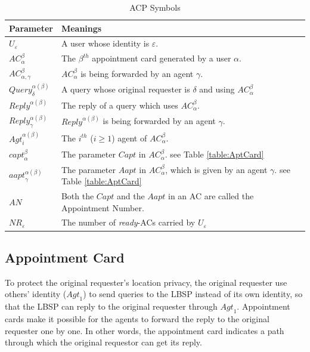 \documentclass[conference]{IEEEtran}
\begin{document}
\begin{table} [hbtp]
\caption{ACP Symbols}
\label{table:ACPSymbols}
\centering
\tabulinesep=0.5mm
\begin{tabu} to 80mm{|X[1,c]|X[4,l]|} \hline 
Parameter & Meanings \\ \hline 
${U}_{\varepsilon}$ & A user whose identity is $\varepsilon$. \\ \hline 
${AC}_{\alpha}^{\beta}$ & The $\beta^{th}$ appointment card generated by a user $\alpha$. \\ \hline 
${AC}_{{\alpha},{\gamma}}^{\beta}$ & ${AC}_{\alpha}^{\beta}$ is being forwarded by an agent $\gamma$. \\ \hline 
${Query}_{\delta}^{{\alpha}\left({\beta}\right)}$ & A query whose original requester is $\delta$ and using ${AC}_{\alpha}^{\beta}$ \\ \hline 
${{Reply}}^{{\alpha}\left({\beta}\right)}$ & The reply of a query which uses ${AC}_{\alpha}^{\beta}$. \\ \hline 
${{Reply}}_{\gamma}^{{\alpha}\left({\beta}\right)}$ & ${Reply}^{\alpha\left(\beta\right)}$ is being forwarded by an agent $\gamma$. \\ \hline 
${{Agt}}_{i}^{{\alpha}\left({\beta}\right)}$ & The $i^{th}$ ($i\geq1$) agent of ${AC}_{\alpha}^{\beta}$. \\ \hline 
${{capt}}_{\alpha}^{\beta}$ & The parameter $Capt$ in ${AC}_\alpha^\beta$. see Table \ref{table:AptCard} \\ \hline 
${{aapt}}_{\gamma}^{{\alpha}\left({\beta}\right)}$ & The parameter $Aapt$ in ${AC}_{\alpha}^{\beta}$, which is given by an agent $\gamma$. see Table \ref{table:AptCard} \\ \hline 
$AN$ & Both the $Capt$ and the $Aapt$ in an AC are called the Appointment Number. \\ \hline 
${NR}_{\varepsilon}$ & The number of \textit{ready}-ACs carried by ${U}_{\varepsilon}$ \\ \hline 
\end{tabu}
\end{table}

\subsection{ Appointment Card}

To protect the original requester's location privacy, the original requester use others' identity (${Agt}_1$) to send queries to the LBSP instead of its own identity, so that the LBSP can reply to the original requester through ${Agt}_1$. Appointment cards make it possible for the agents to forward the reply to the original requester one by one. In other words, the appointment card indicates a path through which the original requestor can get its reply. 
\end{document}
